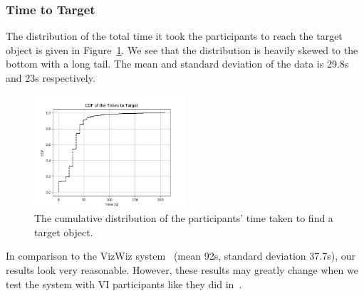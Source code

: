 \documentclass[a4paper, twoside]{article}
\begin{document}

\subsubsection{Time to Target}

\noindent The distribution of the total time it took the participants to reach the target object is given in Figure~\ref{fig:time-participants}. We see that the distribution is heavily skewed to the bottom with a long tail. The mean and standard deviation of the data is 29.8s and 23s respectively. %

\begin{figure}
  \centering
  \includegraphics[width=0.5\textwidth]{figures/cdf_total_time.png}
  \caption{The cumulative distribution of the participants' time taken to find a target object. }\label{fig:time-participants}
\end{figure}

In comparison to the VizWiz system~\cite{bigham2010vizwiz} (mean 92s, standard deviation 37.7s), our results look very reasonable. However, these results may greatly change when we test the system with VI participants like they did in~\cite{bigham2010vizwiz}.
\end{document}
